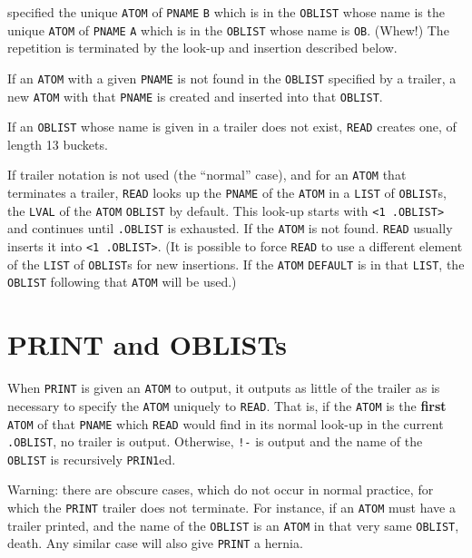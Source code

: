 \documentclass[a4paper]{scrbook}
\begin{document}
specified the unique \texttt{ATOM} of \texttt{PNAME} \texttt{B} which is in the \texttt{OBLIST} whose name is the unique
\texttt{ATOM} of \texttt{PNAME} \texttt{A} which is in the \texttt{OBLIST} whose name is \texttt{OB}. (Whew!) The
repetition is terminated by the look-up and insertion described below.

If an \texttt{ATOM} with a given \texttt{PNAME} is not found in the \texttt{OBLIST} specified by a trailer, a new
\texttt{ATOM} with that \texttt{PNAME} is created and inserted into that \texttt{OBLIST}.

If an \texttt{OBLIST} whose name is given in a trailer does not exist, \texttt{READ} creates one, of length 13 buckets.

If trailer notation is not used (the ``normal'' case), and for an \texttt{ATOM} that terminates a trailer, \texttt{READ}
looks up the \texttt{PNAME} of the \texttt{ATOM} in a \texttt{LIST} of \texttt{OBLIST}s, the \texttt{LVAL} of the
\texttt{ATOM} \texttt{OBLIST} by default. This look-up starts with \texttt{\textless{}1\ .OBLIST\textgreater{}} and
continues until \texttt{.OBLIST} is exhausted. If the \texttt{ATOM} is not found. \texttt{READ} usually inserts it into
\texttt{\textless{}1\ .OBLIST\textgreater{}}. (It is possible to force \texttt{READ} to use a different element of the
\texttt{LIST} of \texttt{OBLIST}s for new insertions. If the \texttt{ATOM} \texttt{DEFAULT} is in
that \texttt{LIST}, the \texttt{OBLIST} following that \texttt{ATOM} will be used.)

\section{PRINT and OBLISTs}\label{print-and-oblists}

When \texttt{PRINT} is given an \texttt{ATOM} to output, it outputs as little of the trailer as is
necessary to specify the \texttt{ATOM} uniquely to \texttt{READ}. That is, if the \texttt{ATOM} is the \textbf{first}
\texttt{ATOM} of that \texttt{PNAME} which \texttt{READ} would find in its normal look-up in the current \texttt{.OBLIST},
no trailer is output. Otherwise, \texttt{!-} is output and the name of the \texttt{OBLIST} is recursively \texttt{PRIN1}ed.

Warning: there are obscure cases, which do not occur in normal practice, for which the \texttt{PRINT} trailer does not
terminate. For instance, if an \texttt{ATOM} must have a trailer printed, and the name of the \texttt{OBLIST} is an
\texttt{ATOM} in that very same \texttt{OBLIST}, death. Any similar case will also give \texttt{PRINT} a hernia.
\end{document}
